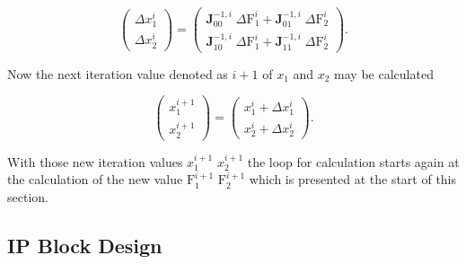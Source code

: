 \documentclass[a4paper, twoside, 11pt]{article}
\newcommand{\fbar}{\FloatBarrier}
\begin{document}
    \begin{equation}
        \begin{pmatrix}
            \Delta x_1^i \\
            \Delta x_2^i
        \end{pmatrix}
        =
        \begin{pmatrix}
            \textbf{J}_{00}^{-1,i} \;\Delta \text{F}_1^i + \textbf{J}_{01}^{-1,i} \;\Delta \text{F}_2^i\\ 
            \textbf{J}_{10}^{-1,i} \;\Delta \text{F}_1^i + \textbf{J}_{11}^{-1,i} \;\Delta \text{F}_2^i
        \end{pmatrix}.
    \end{equation}

    \par
    Now the next iteration value denoted as $i+1$ of $x_1$ and $x_2$ may be calculated

    \begin{equation}
        \begin{pmatrix}
            x_1^{i+1}\\
            x_2^{i+1}
        \end{pmatrix}
        =
        \begin{pmatrix}
            x_1^i + \Delta x_1^i\\
            x_2^i + \Delta x_2^i
        \end{pmatrix}.
    \end{equation}
\par
    With those new iteration values $x_1^{i+1}$ $x_2^{i+1}$ the loop for calculation starts again at the calculation of the new value $\text{F}_1^{i+1}$ $\text{F}_2^{i+1}$ which is presented at the start of this section.

    \subsection{IP Block Design}
        
        \fbar
\end{document}
